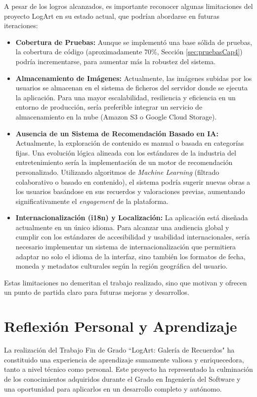 A pesar de los logros alcanzados, es importante reconocer algunas limitaciones del proyecto LogArt en su estado actual, que podrían abordarse en futuras iteraciones:
\begin{itemize}
    \item \textbf{Cobertura de Pruebas:}
    Aunque se implementó una base sólida de pruebas, la cobertura de código (aproximadamente 70\%, Sección \ref{sec:pruebasCap4}) podría incrementarse, para aumentar más la robustez del sistema.
    \item \textbf{Almacenamiento de Imágenes:} Actualmente, las imágenes subidas por los usuarios se almacenan en el sistema de ficheros del servidor donde se ejecuta la aplicación. Para una mayor escalabilidad, resiliencia y eficiencia en un entorno de producción, sería preferible integrar un servicio de almacenamiento en la nube (Amazon S3 o Google Cloud Storage).
    \item \textbf{Ausencia de un Sistema de Recomendación Basado en IA:}
    Actualmente, la exploración de contenido es manual o basada en categorías fijas. Una evolución lógica alineada con los estándares de la industria del entretenimiento sería la implementación de un motor de recomendación personalizado. Utilizando algoritmos de \textit{Machine Learning} (filtrado colaborativo o basado en contenido), el sistema podría sugerir nuevas obras a los usuarios basándose en sus recuerdos y valoraciones previas, aumentando significativamente el \textit{engagement} de la plataforma.
    \item \textbf{Internacionalización (i18n) y Localización:}
    La aplicación está diseñada actualmente en un único idioma. Para alcanzar una audiencia global y cumplir con los estándares de accesibilidad y usabilidad internacionales, sería necesario implementar un sistema de internacionalización que permitiera adaptar no solo el idioma de la interfaz, sino también los formatos de fecha, moneda y metadatos culturales según la región geográfica del usuario.

    
\end{itemize}
Estas limitaciones no demeritan el trabajo realizado, sino que motivan y ofrecen un punto de partida claro para futuras mejoras y desarrollos.

\section{Reflexión Personal y Aprendizaje}
\label{sec:reflexionPersonal}

La realización del Trabajo Fin de Grado ``LogArt: Galería de Recuerdos" ha constituido una experiencia de aprendizaje sumamente valiosa y enriquecedora, tanto a nivel técnico como personal. Este proyecto ha representado la culminación de los conocimientos adquiridos durante el Grado en Ingeniería del Software y una oportunidad para aplicarlos en un desarrollo completo y autónomo.


